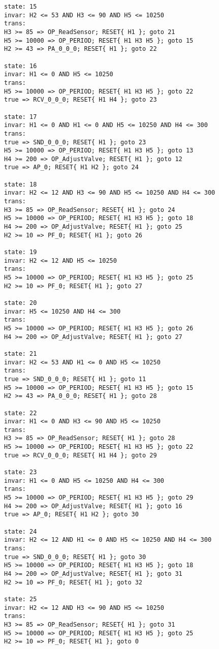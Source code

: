 {\begin{verbatim}
state: 15
invar: H2 <= 53 AND H3 <= 90 AND H5 <= 10250
trans: 
H3 >= 85 => OP_ReadSensor; RESET{ H1 }; goto 21
H5 >= 10000 => OP_PERIOD; RESET{ H1 H3 H5 }; goto 15
H2 >= 43 => PA_0_0_0; RESET{ H1 }; goto 22

state: 16
invar: H1 <= 0 AND H5 <= 10250
trans: 
H5 >= 10000 => OP_PERIOD; RESET{ H1 H3 H5 }; goto 22
true => RCV_0_0_0; RESET{ H1 H4 }; goto 23

state: 17
invar: H1 <= 0 AND H1 <= 0 AND H5 <= 10250 AND H4 <= 300
trans: 
true => SND_0_0_0; RESET{ H1 }; goto 23
H5 >= 10000 => OP_PERIOD; RESET{ H1 H3 H5 }; goto 13
H4 >= 200 => OP_AdjustValve; RESET{ H1 }; goto 12
true => AP_0; RESET{ H1 H2 }; goto 24

state: 18
invar: H2 <= 12 AND H3 <= 90 AND H5 <= 10250 AND H4 <= 300
trans: 
H3 >= 85 => OP_ReadSensor; RESET{ H1 }; goto 24
H5 >= 10000 => OP_PERIOD; RESET{ H1 H3 H5 }; goto 18
H4 >= 200 => OP_AdjustValve; RESET{ H1 }; goto 25
H2 >= 10 => PF_0; RESET{ H1 }; goto 26

state: 19
invar: H2 <= 12 AND H5 <= 10250
trans: 
H5 >= 10000 => OP_PERIOD; RESET{ H1 H3 H5 }; goto 25
H2 >= 10 => PF_0; RESET{ H1 }; goto 27

state: 20
invar: H5 <= 10250 AND H4 <= 300
trans: 
H5 >= 10000 => OP_PERIOD; RESET{ H1 H3 H5 }; goto 26
H4 >= 200 => OP_AdjustValve; RESET{ H1 }; goto 27

state: 21
invar: H2 <= 53 AND H1 <= 0 AND H5 <= 10250
trans: 
true => SND_0_0_0; RESET{ H1 }; goto 11
H5 >= 10000 => OP_PERIOD; RESET{ H1 H3 H5 }; goto 15
H2 >= 43 => PA_0_0_0; RESET{ H1 }; goto 28

state: 22
invar: H1 <= 0 AND H3 <= 90 AND H5 <= 10250
trans: 
H3 >= 85 => OP_ReadSensor; RESET{ H1 }; goto 28
H5 >= 10000 => OP_PERIOD; RESET{ H1 H3 H5 }; goto 22
true => RCV_0_0_0; RESET{ H1 H4 }; goto 29

state: 23
invar: H1 <= 0 AND H5 <= 10250 AND H4 <= 300
trans: 
H5 >= 10000 => OP_PERIOD; RESET{ H1 H3 H5 }; goto 29
H4 >= 200 => OP_AdjustValve; RESET{ H1 }; goto 16
true => AP_0; RESET{ H1 H2 }; goto 30

state: 24
invar: H2 <= 12 AND H1 <= 0 AND H5 <= 10250 AND H4 <= 300
trans: 
true => SND_0_0_0; RESET{ H1 }; goto 30
H5 >= 10000 => OP_PERIOD; RESET{ H1 H3 H5 }; goto 18
H4 >= 200 => OP_AdjustValve; RESET{ H1 }; goto 31
H2 >= 10 => PF_0; RESET{ H1 }; goto 32

state: 25
invar: H2 <= 12 AND H3 <= 90 AND H5 <= 10250
trans: 
H3 >= 85 => OP_ReadSensor; RESET{ H1 }; goto 31
H5 >= 10000 => OP_PERIOD; RESET{ H1 H3 H5 }; goto 25
H2 >= 10 => PF_0; RESET{ H1 }; goto 0


\end{verbatim}}

